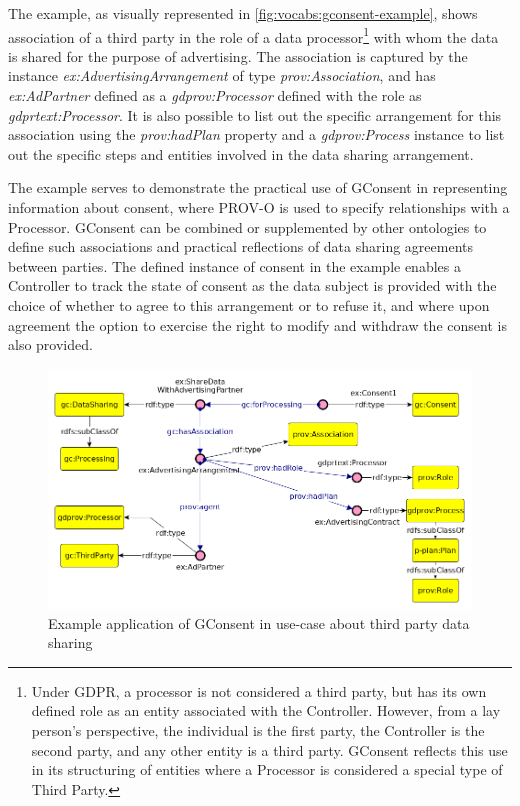 The example, as visually represented in \autoref{fig:vocabs:gconsent-example}, shows association of a third party in the role of a data processor\footnote{Under GDPR, a processor is not considered a third party, but has its own defined role as an entity associated with the Controller. However, from a lay person's perspective, the individual is the first party, the Controller is the second party, and any other entity is a third party. GConsent reflects this use in its structuring of entities where a Processor is considered a special type of Third Party.}
with whom the data is shared for the purpose of advertising. The association is captured by the instance \textit{ex:AdvertisingArrangement} of type \textit{prov:Association}, and has \textit{ex:AdPartner} defined as a \textit{gdprov:Processor} defined with the role as \textit{gdprtext:Processor}. It is also possible to list out the specific arrangement for this association using the \textit{prov:hadPlan} property and a \textit{gdprov:Process} instance to list out the specific steps and entities involved in the data sharing arrangement.

The example serves to demonstrate the practical use of GConsent in representing information about consent, where PROV-O is used to specify relationships with a Processor. GConsent can be combined or supplemented by other ontologies to define such associations and practical reflections of data sharing agreements between parties. The defined instance of consent in the example enables a Controller to track the state of consent as the data subject is provided with the choice of whether to agree to this arrangement or to refuse it, and where upon agreement the option to exercise the right to modify and withdraw the consent is also provided.
\begin{figure}[htbp]
    \centering
    \includegraphics[width=0.8\linewidth]{img/gconsent_third_party_datasharing.png}
    \caption{Example application of GConsent in use-case about third party data sharing \cite{}}
    \label{fig:vocabs:gconsent-example}
\end{figure}

